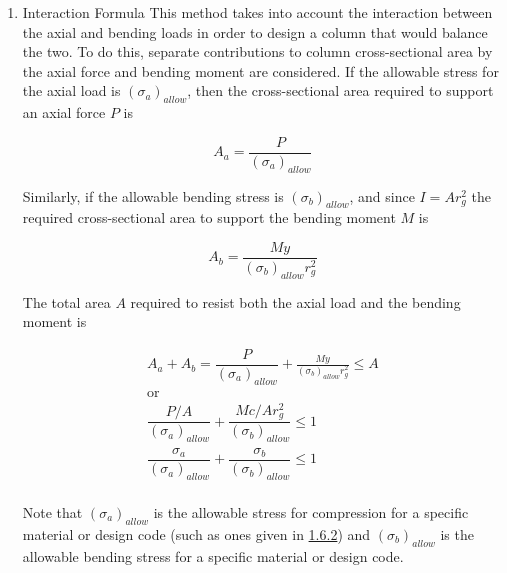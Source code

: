 \documentclass[a4paper,openany,nobib]{tufte-book}
\begin{document}
{{\begin{enumerate}
This stress can then be compared to the allowable stress using the
formulas given in section 5.6.2. The allowable stress should be
calculated using the largest slenderness ratio regardless of the axis
about which the column experiences bending, and should lead to a
conservative design in most cases. If the maximum stress is lower than
the allowable stress then the design is acceptable. If not, the cross
sectional area must be increased and the stress must be re-checked. This
method works well for \emph{short} and \emph{intermediate} columns.

\item Interaction Formula
\label{interaction-formula}
This method takes into account the interaction between the axial and
bending loads in order to design a column that would balance the two. To
do this, separate contributions to column cross-sectional area by the
axial force and bending moment are considered. If the allowable stress
for the axial load is \((\sigma_a)_{allow}\), then the cross-sectional
area required to support an axial force \(P\) is

$$A_a = \frac{P}{(\sigma_a)_{allow}}$$

Similarly, if the allowable bending stress is \((\sigma_b)_{allow}\), and
since \(I = Ar_g^2\) the required cross-sectional area to support the
bending moment \(M\) is

$$A_b = \frac{My}{(\sigma _b)_{allow}r_g^2}$$

The total area \(A\) required to resist both the axial load and the
bending moment is

$$\label{eqn: interaction formula}
  \begin{gathered}
    A_a + A_b = \dfrac{P}{(\sigma_a)_{allow}} + \frac{My}{(\sigma _b)_{allow}r_g^2} \leqslant A \\ 
    \text{or} \\ 
    \dfrac{P/A}{(\sigma_a)_{allow}} + \dfrac{Mc/Ar_g^2}{(\sigma_b)_{allow}} \leqslant 1 \\ 
    \dfrac{\sigma _a}{(\sigma_a)_{allow}} + \dfrac{\sigma_b}{(\sigma_b)_{allow}} \leqslant 1 \\ 
  \end{gathered}$$

Note that \((\sigma_a)_{allow}\) is the allowable stress for compression
for a specific material or design code (such as ones given in
\hyperref[subsection: column concentric loading]{1.6.2}) and
\((\sigma_b)_{allow}\) is the allowable bending stress for a specific
material or design code.


\end{enumerate}}}
\end{document}
